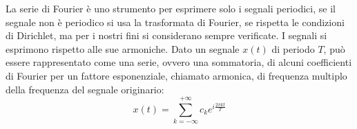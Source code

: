 \documentclass{article}
\numberwithin{equation}{subsection}
\begin{document}
La serie di Fourier è uno strumento per esprimere solo i segnali periodici, 
se il segnale non è periodico si usa la trasformata di Fourier, se rispetta le condizioni di Dirichlet, ma per i nostri fini si considerano sempre verificate. 
I segnali si esprimono rispetto alle sue armoniche. Dato un segnale $x(t)$ di periodo $T$, può essere rappresentato come una serie, ovvero una sommatoria, di alcuni 
coefficienti di Fourier per un fattore esponenziale, chiamato armonica, di frequenza multiplo della frequenza del segnale originario:
\begin{equation}
    x(t)=\displaystyle\sum_{k=-\infty}^{+\infty}c_ke^{i\frac{2\pi  k t}{T}}
\end{equation}
\begin{figure}[H]%
    \centering
    \qquad
    \qquad
\end{figure}
\end{document}
